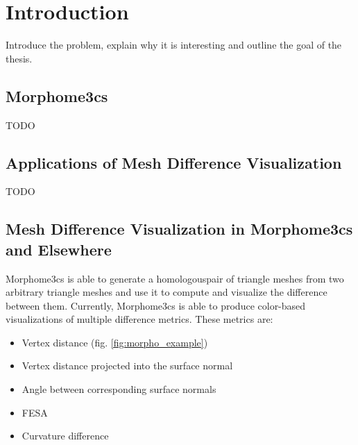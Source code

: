 \chapter*{Introduction}

Introduce the problem, explain why it is interesting and outline the goal of the thesis.

\section*{Morphome3cs}

TODO
\section*{Applications of Mesh Difference Visualization}

TODO
\section*{Mesh Difference Visualization in Morphome3cs and Elsewhere}

Morphome3cs is able to generate a homologous\footnotemark pair of triangle meshes from two arbitrary triangle meshes and use it to compute and visualize the difference between them. Currently, Morphome3cs is able to produce color-based visualizations of multiple difference metrics. These metrics are:

\begin{itemize}
\item Vertex distance (fig. \ref{fig:morpho_example})
\item Vertex distance projected into the surface normal
\item Angle between corresponding surface normals
\item FESA\footnotemark
\item Curvature difference
\end{itemize}

